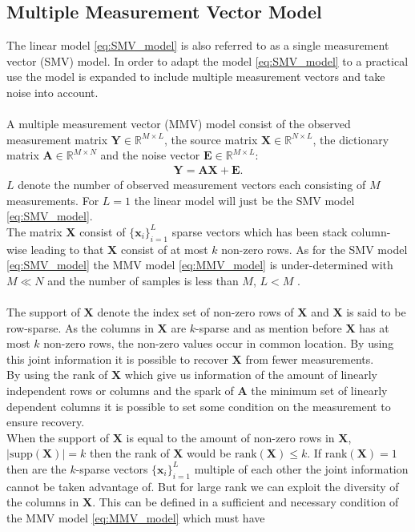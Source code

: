 \subsection{Multiple Measurement Vector Model}
The linear model \eqref{eq:SMV_model} is also referred to as a single measurement vector (SMV) model. In order to adapt the model \eqref{eq:SMV_model} to a practical use the model is expanded to include multiple measurement vectors and take noise into account.
\\ \\
A multiple measurement vector (MMV) model consist of the observed measurement matrix $\mathbf{Y} \in \mathbb{R}^{M \times L}$, the source matrix $\mathbf{X} \in \mathbb{R}^{N \times L}$, the dictionary matrix $\mathbf{A} \in \mathbb{R}^{M \times N}$ and the noise vector $\textbf{E} \in \mathbb{R}^{M \times L}$:
\begin{align}\label{eq:MMV_model}
\mathbf{Y} = \mathbf{AX}+\textbf{E}.
\end{align}
$L$ denote the number of observed measurement vectors each consisting of $M$ measurements. For $L = 1$ the linear model will just be the SMV model \eqref{eq:SMV_model}. 
\\
The matrix $\mathbf{X}$ consist of $\lbrace \mathbf{x}_i \rbrace_{i=1}^L$ sparse vectors which has been stack column-wise leading to that $\mathbf{X}$ consist of at most $k$ non-zero rows. As for the SMV model \eqref{eq:SMV_model} the MMV model \eqref{eq:MMV_model} is under-determined with $M \ll N$ and the number of samples is less than $M$, $L < M$ \cite[p. 42]{CS}.
\\ \\
The support of $\mathbf{X}$ denote the index set of non-zero rows of $\mathbf{X}$ and $\mathbf{X}$ is said to be row-sparse. As the columns in $\mathbf{X}$ are $k$-sparse and as mention before $\mathbf{X}$ has at most $k$ non-zero rows, the non-zero values occur in common location. By using this joint information it is possible to recover $\mathbf{X}$ from fewer measurements.
\\
By using the rank of $\mathbf{X}$ which give us information of the amount of linearly independent rows or columns and the spark of $\mathbf{A}$ the minimum set of linearly dependent columns it is possible to set some condition on the measurement to ensure recovery.
\\
When the support of $\mathbf{X}$ is equal to the amount of non-zero rows in $\mathbf{X}$, $\vert \text{supp}(\mathbf{X})\vert = k$ then the rank of $\mathbf{X}$ would be $\text{rank}(\mathbf{X}) \leq k$. If rank$(\mathbf{X}) = 1$ then are the $k$-sparse vectors $\lbrace \mathbf{x}_i \rbrace_{i=1}^L$ multiple of each other the joint information cannot be taken advantage of. But for large rank we can exploit the diversity of the columns in $\mathbf{X}$. This can be defined in a sufficient and necessary condition of the MMV model \eqref{eq:MMV_model} which must have

